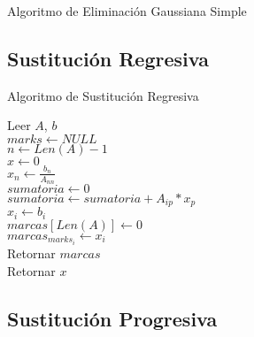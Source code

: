 \documentclass[12pt]{article}
\begin{document}
        \begin{algorithm}[H]
            \caption{Algoritmo de Eliminación Gaussiana Simple}
            
        \end{algorithm}


        \subsection{Sustitución Regresiva}
        
        \begin{algorithm}[H]
            \caption{Algoritmo de Sustitución Regresiva}
            Leer $A$, $b$ \\
            $marks \leftarrow NULL$ \\
            $n \leftarrow Len(A) - 1$ \\ 
            $x \leftarrow 0$ \\
            $x_{n} \leftarrow \frac{b_n}{A_{nn}}$ \\
            {
                $sumatoria \leftarrow 0$ \\
                {
                    $sumatoria \leftarrow sumatoria + A_{ip}*x_{p}$\\
                }
                $x_{i} \leftarrow b_{i}$\\
            }
            {
                $marcas[Len(A)] \leftarrow 0$\\
                {
                    $marcas_{marks_{i}} \leftarrow x_{i}$\\
                }
                Retornar $marcas$\\
            }
            Retornar $x$\\
        \end{algorithm}

        \subsection{Sustitución Progresiva}
        
\end{document}
